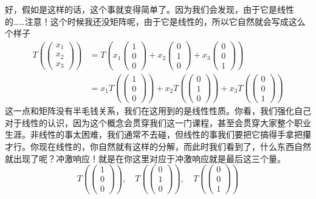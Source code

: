 \documentclass[a4paper,12pt]{article}
\begin{document}
好，假如是这样的话，这个事就变得简单了。因为我们会发现，由于它是线性的……注意！这个时候我还没矩阵呢，由于它是线性的，所以它自然就会写成这么个样子
\begin{equation}
\begin{aligned} 
T \left (
\begin{pmatrix}  
  x_{1}  \\  
  x_{2}  \\  
  x_{3}   
\end{pmatrix} \right )&=
T \left (
x_1
\begin{pmatrix}  
  1  \\  
  0  \\  
  0   
\end{pmatrix}+
x_2
\begin{pmatrix}  
  0  \\  
  1 \\  
  0   
\end{pmatrix}+
x_3
\begin{pmatrix}  
  0  \\  
  0  \\  
  1   
\end{pmatrix}
\right ) \\
&=
x_1 T \left (
\begin{pmatrix}  
  1  \\  
  0  \\  
  0   
\end{pmatrix}
\right )+
x_2 T \left (
\begin{pmatrix}  
  0  \\  
  1  \\  
  0   
\end{pmatrix}
\right )+
x_3 T \left (
\begin{pmatrix}  
  0  \\  
  0  \\  
  1   
\end{pmatrix}
\right )
\end{aligned} 
\end{equation}
这一点和矩阵没有半毛钱关系，我们在这用到的是线性性质。你看，我们强化自己对于线性的认识，因为这个概念会贯穿我们这一门课程，甚至会贯穿大家整个职业生涯。非线性的事太困难，我们通常不去碰，但线性的事我们要把它搞得手拿把攥才行。你现在线性的，你自然就有这样的分解，而此时我们看到了，什么东西自然就出现了呢？冲激响应！就是在你这里对应于冲激响应就是最后这三个量。
\begin{equation}
T \left (
\begin{pmatrix}  
  1  \\  
  0  \\  
  0   
\end{pmatrix}
\right ),\quad
T \left (
\begin{pmatrix}  
  0  \\  
  1  \\  
  0   
\end{pmatrix}
\right ),\quad
T \left (
\begin{pmatrix}  
  0  \\  
  0  \\  
  1   
\end{pmatrix}
\right )
\end{equation}
\end{document}
